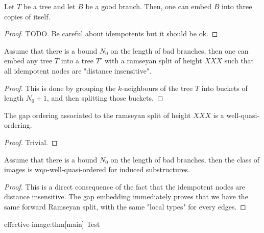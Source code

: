 \begin{lemma}
    Let $T$ be a tree and let $B$ be a good branch. Then, one can embed     
    $B$ into three copies of itself.
\end{lemma}
\begin{proof}
    TODO. Be careful about idempotents but it should be ok.
\end{proof}

\begin{lemma}
    Assume that there is a bound $N_0$ on the length of bad branches, then
    one can embed any tree $T$ into a tree $T'$ with a ramseyan split of height $XXX$
    such that all idempotent nodes are "distance insensitive".
\end{lemma}
\begin{proof}
    This is done by grouping the $k$-neighbours of the tree $T$ into buckets of length $N_0 + 1$, and then
    splitting those buckets. 
\end{proof}

\begin{lemma}
    The gap ordering associated to the ramseyan split of height $XXX$ is a well-quasi-ordering.
\end{lemma}
\begin{proof}
    Trivial.
\end{proof}

\begin{theorem}
    Assume that there is a bound $N_0$ on the length of bad branches, then
    the class of images is wqo-well-quasi-ordered for induced substructures.
\end{theorem}
\begin{proof}
    This is a direct consequence of the fact that the idempotent nodes are distance insensitive.
    The gap embedding immediately proves that we have the same forward Ramseyan split,
    with the same "local types" for every edges.
\end{proof}


\begin{proofof}{effective-image:thm}[main]
    Test
\end{proofof}

